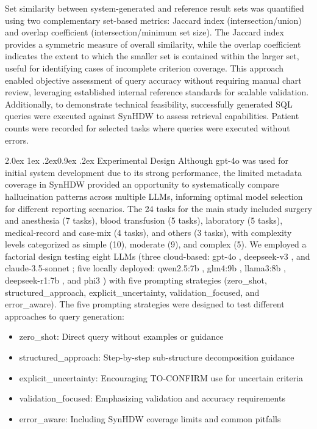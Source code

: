 \documentclass[10pt,twocolumn]{article}
\makeatletter
\renewcommand\subsection{\@startsection{subsection}{2}{\z@}%
  {2.0ex \@plus 1ex \@minus .2ex}{0.9ex \@plus .2ex}%
  {\normalfont\normalsize\bfseries}}
\makeatother
\begin{document}
Set similarity between system-generated and reference result sets was quantified
using two complementary set-based metrics: Jaccard index (intersection/union)
and overlap coefficient (intersection/minimum set size). The Jaccard index
provides a symmetric measure of overall similarity, while the overlap
coefficient indicates the extent to which the smaller set is contained within
the larger set, useful for identifying cases of incomplete criterion coverage.
This approach enabled objective assessment of query accuracy without requiring
manual chart review, leveraging established internal reference standards for
scalable validation. Additionally, to demonstrate technical feasibility,
successfully generated SQL queries were executed against SynHDW to assess
retrieval capabilities. Patient counts were recorded for selected tasks where
queries were executed without errors.

\subsection{Experimental Design}
Although gpt-4o was used for initial system development due to its strong
performance, the limited metadata coverage in SynHDW provided an opportunity to
systematically compare hallucination patterns across multiple LLMs, informing
optimal model selection for different reporting scenarios. The 24 tasks for the
main study included surgery and anesthesia (7 tasks), blood transfusion (5
tasks), laboratory (5 tasks), medical-record and case-mix (4 tasks), and others
(3 tasks), with complexity levels categorized as simple (10), moderate (9), and
complex (5). We employed a factorial design testing eight LLMs (three
cloud-based: gpt-4o \cite{gpt4}, deepseek-v3 \cite{dsv3}, and claude-3.5-sonnet
\cite{claude35}; five locally deployed: qwen2.5:7b \cite{qwen25}, glm4:9b
\cite{glm4}, llama3:8b \cite{llama3}, deepseek-r1:7b \cite{dsr1}, and phi3
\cite{phi3}) with five prompting
strategies (zero\_shot, structured\_approach, explicit\_uncertainty,
validation\_focused, and error\_aware). The five prompting strategies were
designed to test different approaches to query generation:

\begin{itemize}[leftmargin=1.4em,itemsep=1pt,topsep=2pt]
  \item zero\_shot: Direct query without examples or guidance
  \item structured\_approach: Step-by-step sub-structure decomposition guidance
  \item explicit\_uncertainty: Encouraging TO-CONFIRM use for uncertain criteria
  \item validation\_focused: Emphasizing validation and accuracy requirements
  \item error\_aware: Including SynHDW coverage limits and common pitfalls
\end{itemize}
\end{document}
